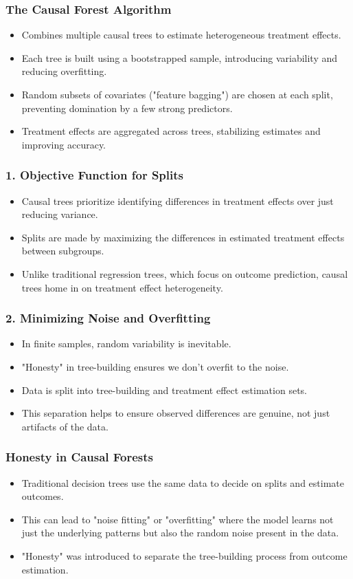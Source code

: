 \documentclass{beamer}
\begin{document}
\begin{frame}
\frametitle{The Causal Forest Algorithm}
\begin{itemize}
    \item Combines multiple causal trees to estimate heterogeneous treatment effects.
    \item Each tree is built using a bootstrapped sample, introducing variability and reducing overfitting.
    \item Random subsets of covariates ("feature bagging") are chosen at each split, preventing domination by a few strong predictors.
    \item Treatment effects are aggregated across trees, stabilizing estimates and improving accuracy.
\end{itemize}
\end{frame}



\begin{frame}
\frametitle{1. Objective Function for Splits}
\begin{itemize}
\item Causal trees prioritize identifying differences in treatment effects over just reducing variance.
\item Splits are made by maximizing the differences in estimated treatment effects between subgroups.
\item Unlike traditional regression trees, which focus on outcome prediction, causal trees home in on treatment effect heterogeneity.
\end{itemize}
\end{frame}

\begin{frame}
\frametitle{2. Minimizing Noise and Overfitting}
\begin{itemize}
\item In finite samples, random variability is inevitable.
\item "Honesty" in tree-building ensures we don't overfit to the noise. 
\item Data is split into tree-building and treatment effect estimation sets.
\item This separation helps to ensure observed differences are genuine, not just artifacts of the data.
\end{itemize}
\end{frame}

\begin{frame}
\frametitle{Honesty in Causal Forests}
\begin{itemize}
\item Traditional decision trees use the same data to decide on splits and estimate outcomes.
\item This can lead to "noise fitting" or "overfitting" where the model learns not just the underlying patterns but also the random noise present in the data.
\item "Honesty" was introduced to separate the tree-building process from outcome estimation.
\end{itemize}
\end{frame}
\end{document}

